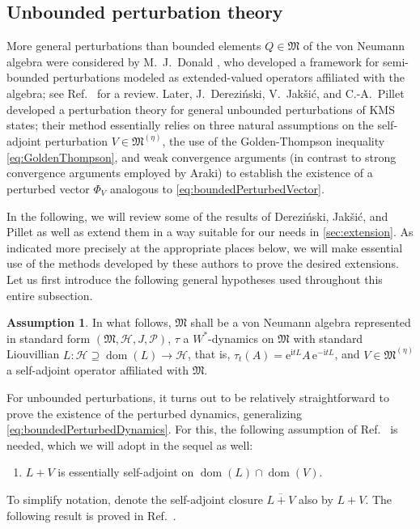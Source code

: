 \documentclass[a4paper, twoside, 11pt, reqno]{amsart}
\theoremstyle{definition}
\newtheorem{assumption}[definition]{Assumption}
\theoremstyle{plain}
\renewcommand{\supset}{\supseteq}
\renewcommand{\Phi}{\varPhi}
\newcommand{\MH}{\mathcal{H}}
\newcommand{\MFM}{\mathfrak{M}}
\newcommand{\ii}{\mathrm{i}}
\newcommand{\ee}{\mathrm{e}}
\newcommand{\NPC}{\mathcal{P}}
\renewcommand{\AE}[1]{#1^{(\eta)}}
\newcommand{\1}{\mathbf{1}}
\DeclareMathOperator{\dom}{dom}
\newcommand{\oln}[1]{\overline{#1}}
\begin{document}
\subsection{Unbounded perturbation theory}\label{subsec:unboundedPerturbations}

More general perturbations than bounded elements $Q \in \MFM$ of the von Neumann algebra were considered by M.~J.~Donald \cite{Donald1987, Donald1990}, who developed a framework for semi-bounded perturbations modeled as extended-valued operators affiliated with the algebra; see Ref.~\cite[Ch. 12]{OP2004} for a review. Later, J.~Derezi\'{n}ski, V.~Jak\v{s}i\'{c}, and C.-A.~Pillet \cite{DJP03} developed a perturbation theory for general unbounded perturbations of KMS states; their method essentially relies on three natural assumptions on the self-adjoint perturbation $V \in \AE{\MFM}$, the use of the Golden-Thompson inequality \eqref{eq:GoldenThompson}, and weak convergence arguments (in contrast to strong convergence arguments employed by Araki) to establish the existence of a perturbed vector $\Phi_V$ analogous to \eqref{eq:boundedPerturbedVector}.

In the following, we will review some of the results of Derezi\'{n}ski, Jak\v{s}i\'{c}, and Pillet as well as extend them in a way suitable for our needs in \cref{sec:extension}. As indicated more precisely at the appropriate places below, we will make essential use of the methods developed by these authors to prove the desired extensions. Let us first introduce the following general hypotheses used throughout this entire subsection.

\begin{assumption}\label{asm:generalSetting}
    In what follows, $\MFM$ shall be a von Neumann algebra represented in standard form $(\MFM, \MH, J, \NPC)$, $\tau$ a $W^\ast$-dynamics on $\MFM$ with standard Liouvillian $L : \MH \supset \dom(L) \to \MH$, that is, $\tau_t(A) = \ee^{\ii t L} A \, \ee^{- \ii t L}$, and $V \in \AE{\MFM}$ a self-adjoint operator affiliated with $\MFM$.
\end{assumption}

For unbounded perturbations, it turns out to be relatively straightforward to prove the existence of the perturbed dynamics, generalizing \cref{eq:boundedPerturbedDynamics}. For this, the following assumption of Ref.~\cite[Assumption 3.1]{DJP03} is needed, which we will adopt in the sequel as well:
\begin{enumerate}[label=\normalfont\bfseries(A\arabic*), ref=\normalfont(A\arabic*)]
    \item \label{enu:A1} $L + V$ is essentially self-adjoint on $\dom(L) \cap \dom(V)$.
\end{enumerate}
To simplify notation, denote the self-adjoint closure $\oln{L + V}$ also by $L + V$. The following result is proved in Ref.~\cite[Thm. 3.3]{DJP03}.
\end{document}
